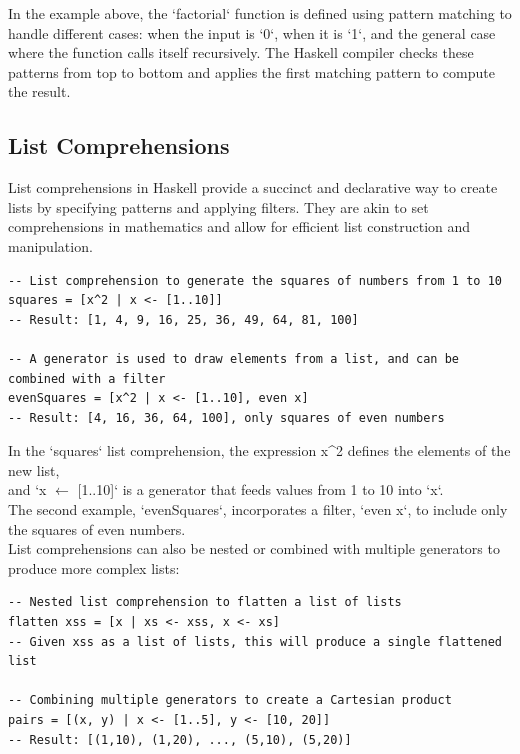 \documentclass[a4paper, 10pt]{article}
\begin{document}
            In the example above, the `factorial` function is defined using pattern matching to handle different cases: when the input is `0`, when it is `1`, and the general case where the function calls itself recursively. The Haskell compiler checks these patterns from top to bottom and applies the first matching pattern to compute the result.

        \newpage
        \subsection{List Comprehensions}

            List comprehensions in Haskell provide a succinct and declarative way to create lists by specifying patterns and applying filters. They are akin to set comprehensions in mathematics and allow for efficient list construction and manipulation.

            \lstset{language=Haskell}
            \begin{lstlisting}
-- List comprehension to generate the squares of numbers from 1 to 10
squares = [x^2 | x <- [1..10]]
-- Result: [1, 4, 9, 16, 25, 36, 49, 64, 81, 100]

-- A generator is used to draw elements from a list, and can be combined with a filter
evenSquares = [x^2 | x <- [1..10], even x]
-- Result: [4, 16, 36, 64, 100], only squares of even numbers
            \end{lstlisting}

            \noindent In the `squares` list comprehension, the expression x\^{}2 defines the elements of the new list, \\
            and `x $\leftarrow$ [1..10]` is a generator that feeds values from 1 to 10 into `x`.\\

            \noindent The second example, `evenSquares`, incorporates a filter, `even x`, to include only the squares of even numbers. \\

            \noindent List comprehensions can also be nested or combined with multiple generators to produce more complex lists:

            \begin{lstlisting}
-- Nested list comprehension to flatten a list of lists
flatten xss = [x | xs <- xss, x <- xs]
-- Given xss as a list of lists, this will produce a single flattened list

-- Combining multiple generators to create a Cartesian product
pairs = [(x, y) | x <- [1..5], y <- [10, 20]]
-- Result: [(1,10), (1,20), ..., (5,10), (5,20)]
            \end{lstlisting}
\end{document}
